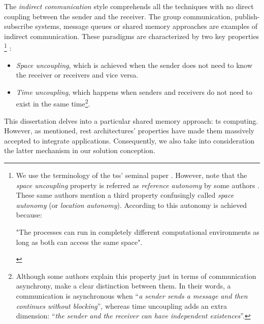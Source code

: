 \medskip


The \emph{indirect communication} style comprehends all the techniques with no direct coupling between the sender and the receiver.
The group communication, publish-subscribe systems, message queues or shared memory approaches are examples of indirect communication.
These paradigms are characterized by two key properties \citep{gelernter_generative_1985,coulouris_distributed_2012}
\footnote{
  We use the terminology of the  \aclp{ts}' seminal paper \citep{gelernter_generative_1985}. %
  However, note that
  the \emph{space uncoupling} property is referred as \emph{reference autonomy} by some authors \citep{fensel_triple-space_2004}. %
  These same authors mention a third property confusingly called \emph{space autonomy} (or \emph{location autonomy}).
  According to \citet{fensel_triple-space_2004} this autonomy is achieved because:
  \begin{emph} %
  "The processes can run in completely different computational environments as long as both can access the same space".
  \end{emph}
}
:

\begin{itemize}
 \item \emph{Space uncoupling}, which is achieved when the sender does not need to know the receiver or receivers and vice versa.
 \item \emph{Time uncoupling}, which happens when senders and receivers do not need to exist in the same time\footnote{
	  Although some authors \citep{fensel_triple-space_2004,krummenacher_www_2005} explain this property just in terms of communication asynchrony,
	  \citet{coulouris_distributed_2012} make a clear distinction between them.
	  In their words, a communication is asynchronous when ``\emph{a sender sends a message and then continues without blocking}'',
	  whereas time uncoupling adds an extra dimension: ``\emph{the sender and the receiver can have independent existences}''.
	  }.
\end{itemize}



This dissertation delves into a particular shared memory approach: \acl{ts} computing. %
However, as mentioned, \ac{rest} architectures' properties have made them massively accepted to integrate applications.
Consequently, we also take into consideration the latter mechanism in our solution conception.